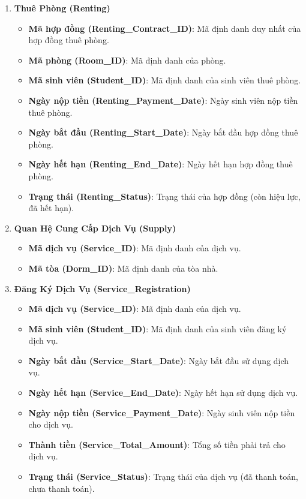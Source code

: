 \documentclass[a4paper,12pt]{article}
\begin{document}
\begin{enumerate}
    \item \textbf{Thuê Phòng (Renting)}
    \begin{itemize}
        \item \textbf{Mã hợp đồng (Renting\_Contract\_ID)}: Mã định danh duy nhất của hợp đồng thuê phòng.
        \item \textbf{Mã phòng (Room\_ID)}: Mã định danh của phòng.
        \item \textbf{Mã sinh viên (Student\_ID)}: Mã định danh của sinh viên thuê phòng.
        \item \textbf{Ngày nộp tiền (Renting\_Payment\_Date)}: Ngày sinh viên nộp tiền thuê phòng.
        \item \textbf{Ngày bắt đầu (Renting\_Start\_Date)}: Ngày bắt đầu hợp đồng thuê phòng.
        \item \textbf{Ngày hết hạn (Renting\_End\_Date)}: Ngày hết hạn hợp đồng thuê phòng.
        \item \textbf{Trạng thái (Renting\_Status)}: Trạng thái của hợp đồng (còn hiệu lực, đã hết hạn).
    \end{itemize}
    
    \item \textbf{Quan Hệ Cung Cấp Dịch Vụ (Supply)}
    \begin{itemize}
        \item \textbf{Mã dịch vụ (Service\_ID)}: Mã định danh của dịch vụ.
        \item \textbf{Mã tòa (Dorm\_ID)}: Mã định danh của tòa nhà.
    \end{itemize}
    
    \item \textbf{Đăng Ký Dịch Vụ (Service\_Registration)}
    \begin{itemize}
        \item \textbf{Mã dịch vụ (Service\_ID)}: Mã định danh của dịch vụ.
        \item \textbf{Mã sinh viên (Student\_ID)}: Mã định danh của sinh viên đăng ký dịch vụ.
        \item \textbf{Ngày bắt đầu (Service\_Start\_Date)}: Ngày bắt đầu sử dụng dịch vụ.
        \item \textbf{Ngày hết hạn (Service\_End\_Date)}: Ngày hết hạn sử dụng dịch vụ.
        \item \textbf{Ngày nộp tiền (Service\_Payment\_Date)}: Ngày sinh viên nộp tiền cho dịch vụ.
        \item \textbf{Thành tiền (Service\_Total\_Amount)}: Tổng số tiền phải trả cho dịch vụ.
        \item \textbf{Trạng thái (Service\_Status)}: Trạng thái của dịch vụ (đã thanh toán, chưa thanh toán).
    \end{itemize}
    

\end{enumerate}
\end{document}
